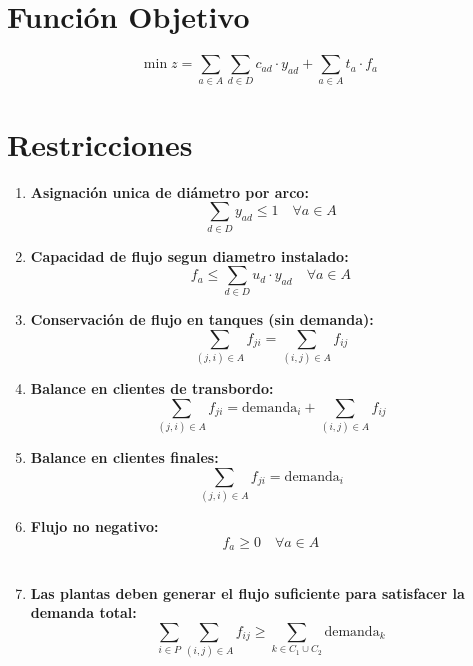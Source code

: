 \documentclass[12pt]{article}
\begin{document}
\section{Función Objetivo}
\begin{equation*}
\min z =  \sum_{a \in A} \sum_{d \in D} c_{ad} \cdot y_{ad} + \sum_{a \in A} t_a \cdot f_a
\end{equation*}


\section{Restricciones}
\begin{enumerate}

\item \textbf{Asignación unica de diámetro por arco:}
\begin{equation*}
\sum_{d \in D} y_{ad} \leq 1 \quad \forall a \in A
\end{equation*}

\item \textbf{Capacidad de flujo segun diametro instalado:}
\begin{equation*}
f_a \leq \sum_{d \in D} u_d \cdot y_{ad} \quad \forall a \in A
\end{equation*}

\item \textbf{Conservación de flujo en tanques (sin demanda):}
\[
    \sum_{(j,i) \in A} f_{ji} = \sum_{(i,j) \in A} f_{ij}
\] 

\item \textbf{Balance en clientes de transbordo:}
 \[
    \sum_{(j,i) \in A} f_{ji} = \text{demanda}_i + \sum_{(i,j) \in A} f_{ij}
\] 


\item \textbf{Balance en clientes finales:}
 \[
    \sum_{(j,i) \in A} f_{ji} = \text{demanda}_i
\] 

\item \textbf{Flujo no negativo:}
\begin{equation*}
f_a \geq 0 \quad \forall a \in A
\end{equation*}\\


\item \textbf{Las plantas deben generar el flujo suficiente para satisfacer la demanda total:}
\[
\sum_{i \in P} \sum_{(i,j) \in A} f_{ij} \geq \sum_{k \in C_1 \cup C_2} \text{demanda}_k
\]

\end{enumerate}
\end{document}
